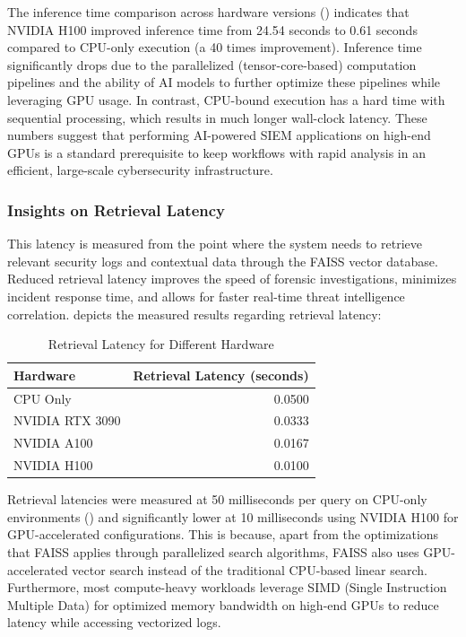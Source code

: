 The inference time comparison across hardware versions () indicates that NVIDIA H100 improved inference time from 24.54 seconds to 0.61 seconds compared to CPU-only execution (a 40 times improvement). Inference time significantly drops due to the parallelized (tensor-core-based) computation pipelines and the ability of AI models to further optimize these pipelines while leveraging GPU usage. In contrast, CPU-bound execution has a hard time with sequential processing, which results in much longer wall-clock latency. These numbers suggest that performing AI-powered SIEM applications on high-end GPUs is a standard prerequisite to keep workflows with rapid analysis in an efficient, large-scale cybersecurity infrastructure.

\subsubsection{Insights on Retrieval Latency}
\label{subsubsec_insights_retrieval_latency}

This latency is measured from the point where the system needs to retrieve relevant security logs and contextual data through the FAISS vector database. Reduced retrieval latency improves the speed of forensic investigations, minimizes incident response time, and allows for faster real-time threat intelligence correlation.  depicts the measured results regarding retrieval latency:

\begin{table}[h!]
\centering
\begin{tabular}{lr}
\hline
\textbf{Hardware} & \textbf{Retrieval Latency (seconds)} \\
\hline
CPU Only & 0.0500 \\
NVIDIA RTX 3090 & 0.0333 \\
NVIDIA A100 & 0.0167 \\
NVIDIA H100 & 0.0100 \\
\hline
\end{tabular}
\caption{Retrieval Latency for Different Hardware}
\label{tab:retrieval-latency-hardware}
\end{table}

Retrieval latencies were measured at 50 milliseconds per query on CPU-only environments () and significantly lower at 10 milliseconds using NVIDIA H100 for GPU-accelerated configurations. This is because, apart from the optimizations that FAISS applies through parallelized search algorithms, FAISS also uses GPU-accelerated vector search instead of the traditional CPU-based linear search. Furthermore, most compute-heavy workloads leverage SIMD (Single Instruction Multiple Data) for optimized memory bandwidth on high-end GPUs to reduce latency while accessing vectorized logs.

